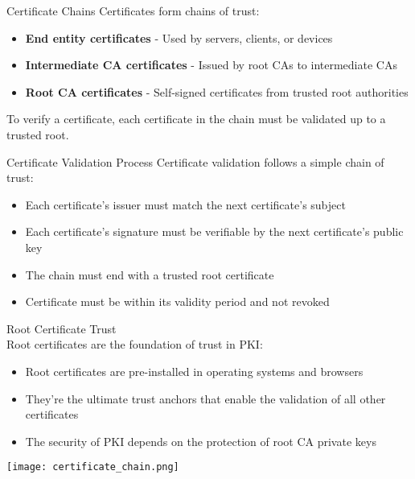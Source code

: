 \begin{definition}{Certificate Chains}
Certificates form chains of trust:
\begin{itemize}
    \item \textbf{End entity certificates} - Used by servers, clients, or devices
    \item \textbf{Intermediate CA certificates} - Issued by root CAs to intermediate CAs
    \item \textbf{Root CA certificates} - Self-signed certificates from trusted root authorities
\end{itemize}
To verify a certificate, each certificate in the chain must be validated up to a trusted root.
\end{definition}

\begin{concept}{Certificate Validation Process}
Certificate validation follows a simple chain of trust:
\begin{itemize}
    \item Each certificate's issuer must match the next certificate's subject
    \item Each certificate's signature must be verifiable by the next certificate's public key
    \item The chain must end with a trusted root certificate
    \item Certificate must be within its validity period and not revoked
\end{itemize}
\end{concept}

\begin{theorem}{Root Certificate Trust}\\
Root certificates are the foundation of trust in PKI:
\begin{itemize}
    \item Root certificates are pre-installed in operating systems and browsers
    \item They're the ultimate trust anchors that enable the validation of all other certificates
    \item The security of PKI depends on the protection of root CA private keys
\end{itemize}
\end{theorem}





\texttt{[image: certificate\_chain.png]}

\multend












